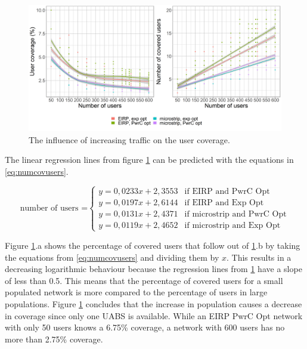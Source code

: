 \begin{figure}[h!]
  \includegraphics[width=\textwidth]{../results/s2/uvsnumdronesAndCov.png}
  \caption{The influence of increasing traffic on the user coverage.}
  \label{fig:s2uvsnumcovusers}
\end{figure}

The linear regression lines from figure \ref{fig:s2uvsnumcovusers} can be predicted with the equations in \ref{eq:numcovusers}.

\begin{equation}
\text{number of users =}
    \begin{cases}
      y = 0,0233x + 2,3553 & \text{if EIRP and PwrC Opt}\\
      y = 0,0197x + 2,6144  & \text{if EIRP and Exp Opt}\\
      y = 0,0131x + 2,4371  & \text{if microstrip and PwrC Opt}\\
      y = 0,0119x + 2,4652  & \text{if microstrip and Exp Opt}
    \end{cases} 
    \label{eq:numcovusers}      
\end{equation}

Figure \ref{fig:s2uvsnumcovusers}.a shows the percentage of covered users that follow out of \ref{fig:s2uvsnumcovusers}.b by taking the equations 
from \ref{eq:numcovusers} and dividing them by $x$.
This results in a decreasing logarithmic behaviour because the regression lines from  \ref{fig:s2uvsnumcovusers} have a slope of less than 0.5.
This means that the percentage of covered users for a small populated network is more compared to the percentage of users in large populations.
Figure \ref{fig:s2uvsnumcovusers} concludes that the increase in population causes a decrease in coverage since only 
one \gls{UABS} is available. While an \gls{EIRP} \gls{PwrC Opt} network with only 50 users knows  a 6.75\% coverage, a network with 600 users has no more than 2.75\% coverage.
 
